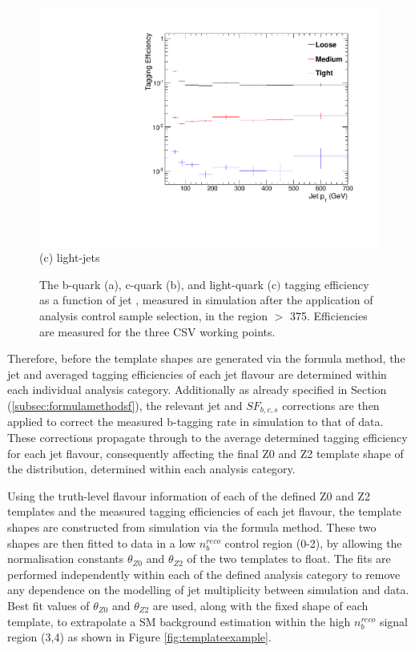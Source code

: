 \begin{figure}[ht]
\begin{minipage}[b]{0.48\linewidth}
\includegraphics[width = 1.0\linewidth]{plots/lighjet_PtDistribution_Htbin_Template_375.pdf}
\centering (c) light-jets
\end{minipage}
\caption[The b-quark (a), c-quark  (b), and light-quark (c$)$ tagging efficiency as a function of jet \pt, measured in simulation after the application of the \alphat analysis \mupjets control sample selection, in the region \theht $>$ 375.]{The b-quark (a), c-quark  (b), and light-quark (c$)$ tagging efficiency as a function of jet \pt, measured in simulation after the application of \alphat analysis \mupjets control sample selection, in the region \theht $>$ 375. Efficiencies are measured for the three \ac{CSV} working points.}
\label{fig:templatetaggingefficiencies}
\end{figure}
\FloatBarrier

Therefore, before the template shapes are generated via the formula method, the jet \pt and \eta averaged tagging efficiencies of each jet flavour are determined within each individual analysis category. Additionally as already specified in Section (\ref{subsec:formulamethodsf}), the relevant jet \pt and \eta $SF_{b,c,s}$ corrections are then applied to correct the measured b-tagging rate in simulation to that of data. These corrections propagate through to the average determined tagging efficiency for each jet flavour, consequently affecting the final Z0 and Z2 template shape of the \nbreco distribution, determined within each analysis category. 

Using the truth-level flavour information of each of the defined Z0 and Z2 templates and the measured tagging efficiencies of each jet flavour, the template shapes are constructed from simulation via the formula method. These two shapes are then fitted to data in a low $n_{b}^{reco}$ control region (0-2), by allowing the normalisation constants $\theta_{Z0}$ and $\theta_{Z2}$ of the two templates to float. The fits are performed independently within each of the defined analysis category to remove any dependence on the modelling of jet multiplicity between simulation and data. Best fit values of $\theta_{Z0}$ and $\theta_{Z2}$ are used, along with the fixed shape of each template, to extrapolate a \ac{SM} background estimation within the high $n_{b}^{reco}$ signal region (3,4) as shown in Figure \ref{fig:templateexample}. 

